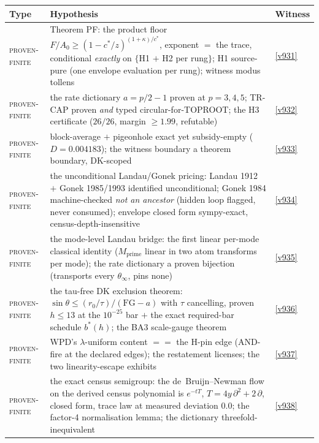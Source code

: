 \begin{center}\footnotesize
\renewcommand{\arraystretch}{1.22}
\begin{tabularx}{\linewidth}{@{}l>{\hsize=1.45\hsize\raggedright\arraybackslash}X>{\hsize=0.55\hsize\raggedright\arraybackslash}X@{}}
\toprule
\textbf{Type} & \textbf{Hypothesis} & \textbf{Witness} \\
\midrule
\textsc{proven-finite} & Theorem PF: the product floor $F/A_0 \ge (1 - c^*/z)^{(1+\kappa)/c^*}$, exponent $=$ the trace, conditional \emph{exactly} on $\{$H1 $+$ H2 per rung$\}$; H1 source-pure (one envelope evaluation per rung); witness modus tollens & \vref{v931} \\
\textsc{proven-finite} & the rate dictionary $a = p/2 - 1$ proven at $p = 3, 4, 5$; TR-CAP proven \emph{and} typed circular-for-TOPROOT; the H3 certificate ($26/26$, margin $\ge 1.99$, refutable) & \vref{v932} \\
\textsc{proven-finite} & block-average $+$ pigeonhole exact yet subsidy-empty ($D = 0.004183$); the witness boundary a theorem boundary, DK-scoped & \vref{v933} \\
\textsc{proven-finite} & the unconditional Landau/Gonek pricing: Landau 1912 $+$ Gonek 1985/1993 identified unconditional; Gonek 1984 machine-checked \emph{not an ancestor} (hidden loop flagged, never consumed); envelope closed form sympy-exact, census-depth-insensitive & \vref{v934} \\
\textsc{proven-finite} & the mode-level Landau bridge: the first linear per-mode classical identity ($M_{\mathrm{prime}}$ linear in two atom transforms per mode); the rate dictionary a proven bijection (transports every $\theta_\infty$, pins none) & \vref{v935} \\
\textsc{proven-finite} & the tau-free DK exclusion theorem: $\sin\theta \le (r_0/\tau)/(\mathrm{FG} - a)$ with $\tau$ cancelling, proven $h \le 13$ at the $10^{-25}$ bar $+$ the exact required-bar schedule $b^*(h)$; the BA3 scale-gauge theorem & \vref{v936} \\
\textsc{proven-finite} & WPD's $\lambda$-uniform content $==$ the H-pin edge (AND-fire at the declared edges); the restatement licenses; the two linearity-escape exhibits & \vref{v937} \\
\textsc{proven-finite} & the exact census semigroup: the de~Bruijn--Newman flow on the derived census polynomial is $e^{-tT}$, $T = 4y\,\partial^2 + 2\,\partial$, closed form, trace law at measured deviation $0.0$; the factor-4 normalisation lemma; the dictionary threefold-inequivalent & \vref{v938} \\

\end{tabularx}
\end{center}
